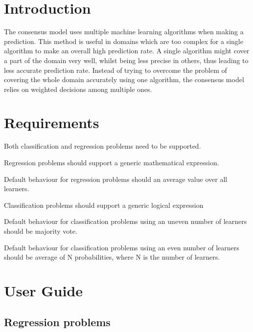 \documentclass[12pt]{article}
\begin{document}
\maketitle

\newpage

\section{Introduction}

The consensus model uses multiple machine learning algorithms when making a prediction.
This method is useful in domains which are too complex for a single
algorithm to make an overall high prediction rate. A single algorithm might cover a part
of the domain very well, whilst being less precise in others, thus leading to less accurate
prediction rate. Instead of trying to overcome the problem of covering the whole domain
accurately using one algorithm, the consensus model relies on weighted decisions among
multiple ones.

\section{Requirements}

\begin{list}{*}{}
\item Both classification and regression problems need to be supported.
\item Regression problems should support a generic mathematical expression.
\item Default behaviour for regression problems should an average value over all learners.
\item Classification problems should support a generic logical expression
\item Default behaviour for classification problems using an uneven number of learners 
  should be majority vote.
\item Default behaviour for classification problems using an even number of learners
  should be average of N probabilities, where N is the number of learners.
\end{list}

\newpage
\section{User Guide}\label{user}

\subsection{Regression problems}
\end{document}
